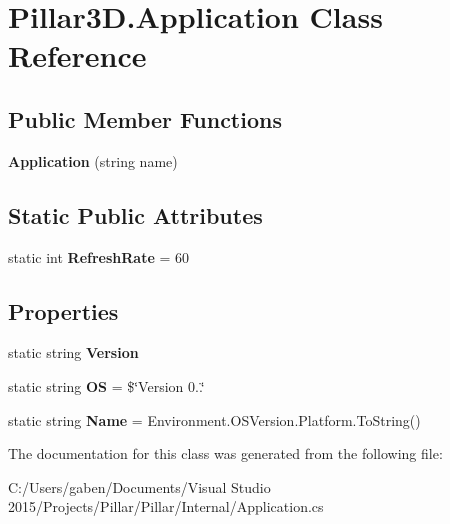 \hypertarget{class_pillar3_d_1_1_application}{}\section{Pillar3\+D.\+Application Class Reference}
\label{class_pillar3_d_1_1_application}
\subsection*{Public Member Functions}
\begin{DoxyCompactItemize}
\item 
\mbox{\label{class_pillar3_d_1_1_application_a31248a85b0b3b187f39728706f3ed1c9}} 
{\bfseries Application} (string name)
\end{DoxyCompactItemize}
\subsection*{Static Public Attributes}
\begin{DoxyCompactItemize}
\item 
\mbox{\label{class_pillar3_d_1_1_application_aaa49c719bd3f8d74f8b1a1bb7a1cf6f9}} 
static int {\bfseries Refresh\+Rate} = 60
\end{DoxyCompactItemize}
\subsection*{Properties}
\begin{DoxyCompactItemize}
\item 
\mbox{\label{class_pillar3_d_1_1_application_af6c4035d90799be965e411ec1207c9af}} 
static string {\bfseries Version}
\item 
\mbox{\label{class_pillar3_d_1_1_application_a5effc5fbea9c01a7ed564f9b70e527c6}} 
static string {\bfseries OS} = \$\char`\"{}Version 0..\char`\"{}
\item 
\mbox{\label{class_pillar3_d_1_1_application_ad1c6f009d2706b07f1582145441dd223}} 
static string {\bfseries Name} = Environment.\+O\+S\+Version.\+Platform.\+To\+String()
\end{DoxyCompactItemize}


The documentation for this class was generated from the following file\+:\begin{DoxyCompactItemize}
\item 
C\+:/\+Users/gaben/\+Documents/\+Visual Studio 2015/\+Projects/\+Pillar/\+Pillar/\+Internal/Application.\+cs\end{DoxyCompactItemize}
